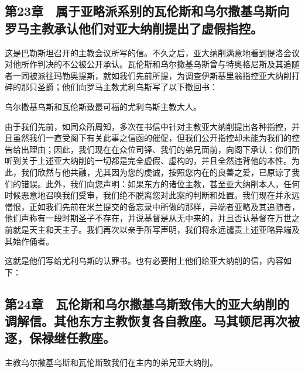 
\subsection{第23章　属于亚略派系别的瓦伦斯和乌尔撒基乌斯向罗马主教承认他们对亚大纳削提出了虚假指控。}

这是巴勒斯坦召开的主教会议所写的信。不久之后，亚大纳削满意地看到提洛会议对他所作判决的不公被公开承认。瓦伦斯和乌尔撒基乌斯曾与特奥格尼斯及其追随者一同被派往玛勒奥提斯，就如我们先前所提，为调查伊斯基里翁指控亚大纳削打碎的那只圣爵；他们向罗马主教尤利乌斯写了以下撤回书：\par

乌尔撒基乌斯和瓦伦斯致最可福的尤利乌斯主教大人。\par

由于我们先前，如同众所周知，多次在书信中针对主教亚大纳削提出各种指控，并且虽然我们一直受阁下有关此事之信函的催促，但我们公开指控却未能为我们的控告给出理由；因此，我们现在在众位司铎、我们的弟兄面前，向阁下承认：你们所听到关于上述亚大纳削的一切都是完全虚假、虚构的，并且全然违背他的本性。为此，我们欣然与他共融，尤其因为您的虔诚，按照您内在的良善之爱，已原谅了我们的错误。此外，我们向您声明：如果东方的诸位主教，甚至亚大纳削本人，任何时候恶意地召唤我们受审，我们绝不脱离您对此案的判断和处置。我们现在并永远憎恨，正如我们先前在米兰提交的备忘录中所做的那样，异端者亚略及其追随者，他们声称有一段时期圣子不存在，并说基督是从无中来的，并且否认基督在万世之前就是天主和天主子。我们再次以亲手所写声明，我们将永远谴责上述亚略异端及其始作俑者。\par

\par

这就是他们写给尤利乌斯的认罪书。也有必要附上他们给亚大纳削的信，内容如下：\par


\subsection{第24章　瓦伦斯和乌尔撒基乌斯致伟大的亚大纳削的调解信。其他东方主教恢复各自教座。马其顿尼再次被逐，保禄继任教座。}

主教乌尔撒基乌斯和瓦伦斯致我们在主内的弟兄亚大纳削。\par

